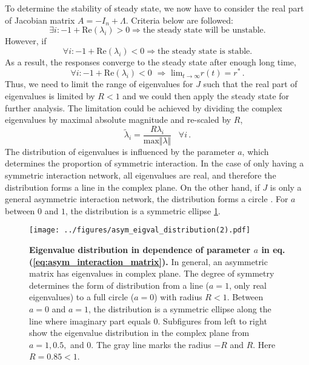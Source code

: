 \documentclass[11pt]{article}
\begin{document}
	To determine the stability of steady state, we now have to consider the real part of Jacobian matrix $A =-I_n + \Lambda$. 
	Criteria below are followed: 
		\begin{equation*}
			\exists i: -1 + \text{Re}(\lambda_i) > 0 \Rightarrow \text{the steady state will be unstable.}
		\end{equation*}
	However, if 
		\begin{equation*}
			\forall i: -1 + \text{Re}(\lambda_i) < 0 \Rightarrow \text{the steady state is stable.}
		\end{equation*}
	As a result, the responses converge to the steady state after enough long time, 
		\begin{equation} \label{eq:asym_stable_fix_point}
			\forall i: -1 + \text{Re}(\lambda_i) < 0 \, \,  \Rightarrow \, \, \text{lim}_{t \rightarrow \infty} r(t) = r^* \, .
		\end{equation}
	Thus, we need to limit the range of eigenvalues for $J$ such that the real part of eigenvalues is limited by $R < 1$ and we could then apply the steady state for further analysis. The limitation could be achieved by dividing the complex eigenvalues by maximal absolute magnitude and re-scaled by $R$, 
		\begin{equation} \label{eq:asym_normalization}
			\tilde{\lambda}_i = \frac{R \lambda_i}{\text{max}\Vert\lambda\Vert} \, \, \, \, \, \forall i \, .
		\end{equation}  
	The distribution of eigenvalues is influenced by the parameter $a$, which determines the proportion of symmetric interaction. In the case of only having a symmetric interaction network, all eigenvalues are real, and therefore the distribution forms a line in the complex plane. On the other hand, if $J$ is only a general asymmetric interaction network, the distribution forms a circle \cite{rajan2006eigenvalue}. For $a$ between $0$ and $1$, the distribution is a symmetric ellipse \ref{fig:complex_eigval_distribution}. 
		\begin{figure} [H]
			\centering
			\texttt{[image: ../figures/asym\_eigval\_distribution(2).pdf]}
			\caption[Eigenvalue distribution in dependence of parameter $a$ in eq.(\ref{eq:asym_interaction_matrix})]{\textbf{Eigenvalue distribution in dependence of parameter $a$ in eq.(\ref{eq:asym_interaction_matrix}).} In general, an asymmetric matrix has eigenvalues in complex plane. The degree of symmetry determines the form of distribution from a line ($a = 1$, only real eigenvalues) to a full circle ($a = 0$) with radius $R < 1$. Between $a = 0$ and $a = 1$, the distribution is a symmetric ellipse along the line where imaginary part equals $0$. Subfigures from left to right show the eigenvalue distribution in the complex plane from $a = 1, 0.5,$ and $0$. The gray line marks the radius $-R$ and $R$. Here $R = 0.85 < 1$.}
			\label{fig:complex_eigval_distribution}
		\end{figure}
	
\end{document}
